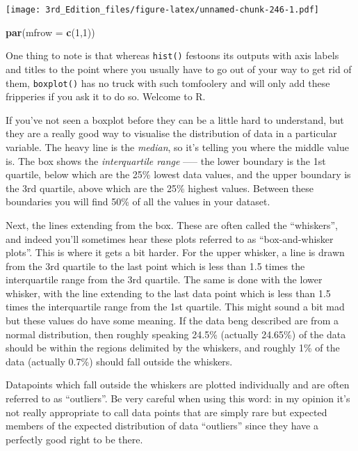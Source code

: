 \documentclass[
]{book}
\newenvironment{Shaded}{\begin{snugshade}}{\end{snugshade}}
\newcommand{\DataTypeTok}[1]{\textcolor[rgb]{0.13,0.29,0.53}{#1}}
\newcommand{\DecValTok}[1]{\textcolor[rgb]{0.00,0.00,0.81}{#1}}
\newcommand{\KeywordTok}[1]{\textcolor[rgb]{0.13,0.29,0.53}{\textbf{#1}}}
\newcommand{\NormalTok}[1]{#1}
\begin{document}
\texttt{[image: 3rd\_Edition\_files/figure-latex/unnamed-chunk-246-1.pdf]}

\begin{Shaded}
\begin{Highlighting}[]

\KeywordTok{par}\NormalTok{(}\DataTypeTok{mfrow =} \KeywordTok{c}\NormalTok{(}\DecValTok{1}\NormalTok{,}\DecValTok{1}\NormalTok{))}
\end{Highlighting}
\end{Shaded}

One thing to note is that whereas \texttt{hist()} festoons its outputs with axis labels and titles to the point where you usually have to go out of your way to get rid of them, \texttt{boxplot()} has no truck with such tomfoolery and will only add these fripperies if you ask it to do so. Welcome to R.

If you've not seen a boxplot before they can be a little hard to understand, but they are a really good way to visualise the distribution of data in a particular variable. The heavy line is the \emph{median}, so it's telling you where the middle value is. The box shows the \emph{interquartile range} ----- the lower boundary is the 1st quartile, below which are the 25\% lowest data values, and the upper boundary is the 3rd quartile, above which are the 25\% highest values. Between these boundaries you will find 50\% of all the values in your dataset.

Next, the lines extending from the box. These are often called the ``whiskers'', and indeed you'll sometimes hear these plots referred to as ``box-and-whisker plots''. This is where it gets a bit harder. For the upper whisker, a line is drawn from the 3rd quartile to the last point which is less than 1.5 times the interquartile range from the 3rd quartile. The same is done with the lower whisker, with the line extending to the last data point which is less than 1.5 times the interquartile range from the 1st quartile. This might sound a bit mad but these values do have some meaning. If the data beng described are from a normal distribution, then roughly speaking 24.5\% (actually 24.65\%) of the data should be within the regions delimited by the whiskers, and roughly 1\% of the data (actually 0.7\%) should fall outside the whiskers.

Datapoints which fall outside the whiskers are plotted individually and are often referred to as ``outliers''. Be very careful when using this word: in my opinion it's not really appropriate to call data points that are simply rare but expected members of the expected distribution of data ``outliers'' since they have a perfectly good right to be there.
\end{document}
